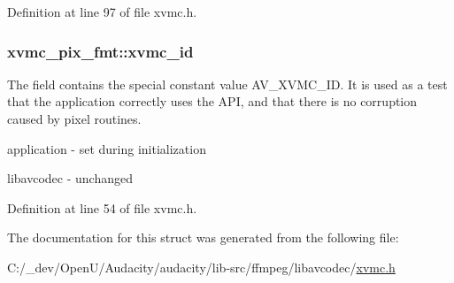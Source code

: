 Definition at line 97 of file xvmc.\+h.

\subsubsection[{\texorpdfstring{xvmc\+\_\+id}{xvmc_id}}]{ xvmc\+\_\+pix\+\_\+fmt\+::xvmc\+\_\+id}\hypertarget{structxvmc__pix__fmt_a6cadfce3023ac1a8730e675629f21430}{}\label{structxvmc__pix__fmt_a6cadfce3023ac1a8730e675629f21430}
The field contains the special constant value A\+V\+\_\+\+X\+V\+M\+C\+\_\+\+ID. It is used as a test that the application correctly uses the A\+PI, and that there is no corruption caused by pixel routines.
\begin{DoxyItemize}
\item application -\/ set during initialization
\item libavcodec -\/ unchanged 
\end{DoxyItemize}

Definition at line 54 of file xvmc.\+h.



The documentation for this struct was generated from the following file\+:\begin{DoxyCompactItemize}
\item 
C\+:/\+\_\+dev/\+Open\+U/\+Audacity/audacity/lib-\/src/ffmpeg/libavcodec/\hyperlink{xvmc_8h}{xvmc.\+h}\end{DoxyCompactItemize}

